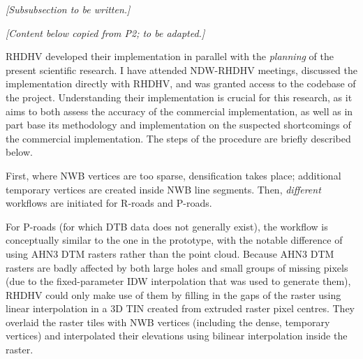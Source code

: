 \textit{[Subsubsection to be written.]}

\textit{[Content below copied from P2; to be adapted.]}

RHDHV developed their implementation in parallel with the \textit{planning} of the present scientific research. I have attended NDW-RHDHV meetings, discussed the implementation directly with RHDHV, and was granted access to the codebase of the project. Understanding their implementation is crucial for this research, as it aims to both assess the accuracy of the commercial implementation, as well as in part base its methodology and implementation on the suspected shortcomings of the commercial implementation. The steps of the procedure are briefly described below.

First, where NWB vertices are too sparse, densification takes place; additional temporary vertices are created inside NWB line segments. Then, \textit{different} workflows are initiated for R-roads and P-roads.

For P-roads (for which DTB data does not generally exist), the workflow is conceptually similar to the one in the prototype, with the notable difference of using AHN3 DTM rasters rather than the point cloud. Because AHN3 DTM rasters are badly affected by both large holes and small groups of missing pixels (due to the fixed-parameter IDW interpolation that was used to generate them), RHDHV could only make use of them by filling in the gaps of the raster using linear interpolation in a 3D TIN created from extruded raster pixel centres. They overlaid the raster tiles with NWB vertices (including the dense, temporary vertices) and interpolated their elevations using bilinear interpolation inside the raster.

